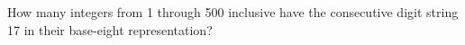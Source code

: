 How many integers from 1 through 500 inclusive have the consecutive digit string 17 in their base-eight representation?
